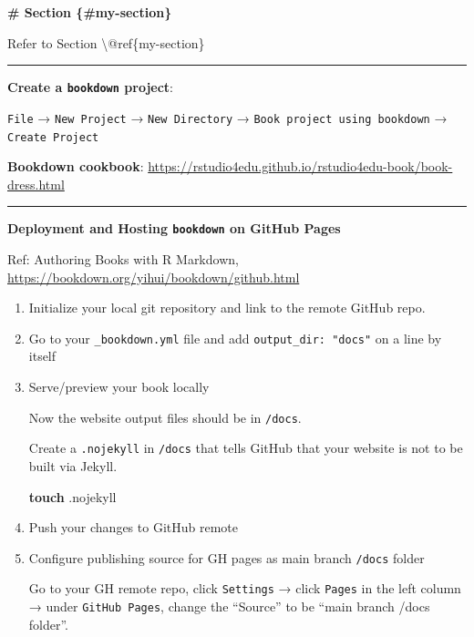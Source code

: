 \documentclass[
]{book}
\newenvironment{Shaded}{\begin{snugshade}}{\end{snugshade}}
\newcommand{\FunctionTok}[1]{\textcolor[rgb]{0.13,0.29,0.53}{\textbf{#1}}}
\newcommand{\NormalTok}[1]{#1}
\theoremstyle{definition}
\theoremstyle{definition}
\theoremstyle{definition}
\theoremstyle{definition}
\theoremstyle{remark}
\begin{document}
\begin{Shaded}
\begin{Highlighting}[]
\FunctionTok{\# Section \{\#my{-}section\}}

\NormalTok{Refer to Section \textbackslash{}@ref\{my{-}section\}}
\end{Highlighting}
\end{Shaded}

\begin{center}\rule{0.5\linewidth}{0.5pt}\end{center}

\textbf{Create a \texttt{bookdown} project}:

\texttt{File} → \texttt{New\ Project} → \texttt{New\ Directory} → \texttt{Book\ project\ using\ bookdown} → \texttt{Create\ Project}

\textbf{Bookdown cookbook}: \url{https://rstudio4edu.github.io/rstudio4edu-book/book-dress.html}

\begin{center}\rule{0.5\linewidth}{0.5pt}\end{center}

\textbf{Deployment and Hosting \texttt{bookdown} on GitHub Pages}

Ref: Authoring Books with R Markdown, \url{https://bookdown.org/yihui/bookdown/github.html}

\begin{enumerate}
\def\labelenumi{\arabic{enumi}.}
\item
  Initialize your local git repository and link to the remote GitHub repo.
\item
  Go to your \texttt{\_bookdown.yml} file and add \texttt{output\_dir:\ "docs"} on a line by itself
\item
  Serve/preview your book locally

  Now the website output files should be in \texttt{/docs}.

  Create a \texttt{.nojekyll} in \texttt{/docs} that tells GitHub that your website is not to be built via Jekyll.

\begin{Shaded}
\begin{Highlighting}[]
\FunctionTok{touch}\NormalTok{ .nojekyll}
\end{Highlighting}
\end{Shaded}
\item
  Push your changes to GitHub remote
\item
  Configure publishing source for GH pages as main branch \texttt{/docs} folder

  Go to your GH remote repo, click \texttt{Settings} → click \texttt{Pages} in the left column → under \texttt{GitHub\ Pages}, change the ``Source'' to be ``main branch /docs folder''.
\end{enumerate}
\end{document}
